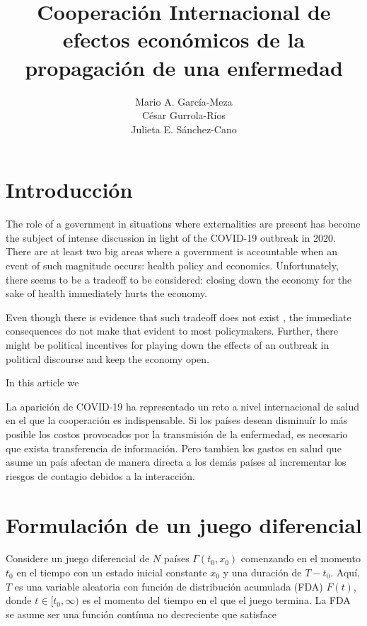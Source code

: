 \documentclass[11pt, oneside]{article}
\title{Cooperación Internacional de efectos económicos de la propagación de una enfermedad}
\author{Mario A. García-Meza\\ César Gurrola-Ríos \\ Julieta E. Sánchez-Cano}
\begin{document}
\maketitle


\section{Introducción}

The role of a government in situations where externalities are present has become the subject of intense discussion in light of the COVID-19 outbreak in 2020. There are at least two big areas where a government is accountable when an event of such magnitude occurs: health policy and economics. Unfortunately, there seems to be a tradeoff to be considered: closing down the economy for the sake of health immediately hurts the economy.

Even though there is evidence that such tradeoff does not exist \cite{Correia}, the immediate consequences do not make that evident to most policymakers. Further, there might be political incentives for playing down the effects of an outbreak in political discourse and keep the economy open.

In this article we 


La aparición de COVID-19 ha representado un reto a nivel internacional de salud en el que la cooperación es indispensable. Si los países desean disminuír lo más posible los costos provocados por la transmisión de la enfermedad, es necesario que exista transferencia de información. Pero tambien los gastos en salud que asume un país afectan de manera directa a los demás países al incrementar los riesgos de contagio debidos a la interacción.

\section{Formulación de un juego diferencial}

Considere un juego diferencial de $N$ países $\Gamma(t_0,x_0)$ comenzando en el momento $t_0$ en el tiempo con un estado inicial constante $x_0$ y una duración de $T-t_0$. Aquí, $T$ es una variable aleatoria con función de distribución acumulada (FDA) $F(t)$, donde $t\in[t_0,\infty)$ es el momento del tiempo en el que el juego termina. La FDA se asume ser una función contínua no decreciente que satisface
\end{document}
